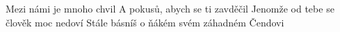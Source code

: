 \ve{}
Mezi námi je mnoho chvil
A pokusů, abych se ti zavděčil
Jenomže od tebe se člověk moc nedoví
Stále básníš o ňákém svém záhadném Čendovi